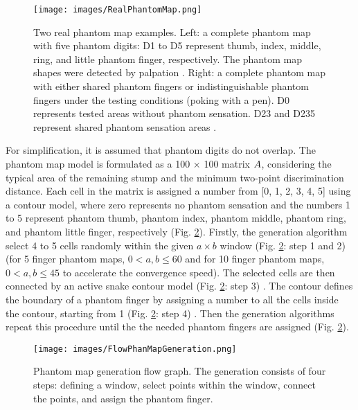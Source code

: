\begin{figure}[htp]
    \centering
    \texttt{[image: images/RealPhantomMap.png]}
    \caption{Two real phantom map examples.  Left: a complete phantom map with five phantom digits: D1 to D5 represent thumb, index, middle, ring, and little phantom finger, respectively.  The phantom map shapes were detected by palpation \cite{antfolk2012sensory}.  Right:  a complete phantom map with either shared phantom fingers or indistinguishable phantom fingers under the testing conditions (poking with a pen).  D0 represents tested areas without phantom sensation. D23 and D235 represent shared phantom sensation areas \cite{zhang2015somatotopical}.}
    \label{fig:RealPhantomMaps}
\end{figure}

For simplification, it is assumed that phantom digits do not overlap. The phantom map model is formulated as a 100 $\times$ 100 matrix $\boldmath{A}$, considering the typical area of the remaining stump and the minimum two-point discrimination distance. Each cell in the matrix is assigned a number from [0, 1, 2, 3, 4, 5] using a contour model, where zero represents no phantom sensation and the numbers 1 to 5 represent phantom thumb, phantom index, phantom middle, phantom ring, and phantom little finger, respectively (Fig. \ref{Fig:FlowPhanMapGeneration}). Firstly, the generation algorithm select 4 to 5 cells randomly within the given $a \times b$ window (Fig. \ref{Fig:FlowPhanMapGeneration}: step 1 and 2) (for 5 finger phantom maps, $0 < a,b \leq 60$ and for 10 finger phantom maps, $0 < a,b \leq 45$ to accelerate the convergence speed). The selected cells are then connected by an active snake contour model (Fig. \ref{Fig:FlowPhanMapGeneration}: step 3) \cite{kass1988snakes}. The contour defines the boundary of a phantom finger by assigning a number to all the cells inside the contour, starting from 1  (Fig. \ref{Fig:FlowPhanMapGeneration}: step 4) . Then the generation algorithms repeat this procedure until the the needed phantom fingers are assigned (Fig. \ref{Fig:FlowPhanMapGeneration}). 

\begin{figure}[htb]
    \centering
    \texttt{[image: images/FlowPhanMapGeneration.png]}
    \caption{Phantom map generation flow graph. The generation consists of four steps: defining a window, select points within the window, connect the points, and assign the phantom finger.}
    \label{Fig:FlowPhanMapGeneration}
\end{figure}

